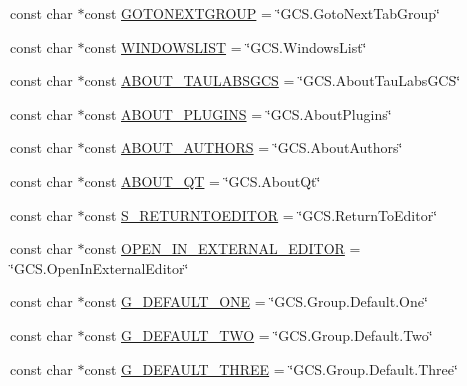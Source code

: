 \begin{DoxyCompactItemize}
\item 
const char $\ast$const \hyperlink{group___core_plugin_gae62f4649a82a845514a98ad61e2fb37a}{\-G\-O\-T\-O\-N\-E\-X\-T\-G\-R\-O\-U\-P} = \char`\"{}\-G\-C\-S.\-Goto\-Next\-Tab\-Group\char`\"{}
\item 
const char $\ast$const \hyperlink{group___core_plugin_ga131a36808daf98493ba6caac1df75d3f}{\-W\-I\-N\-D\-O\-W\-S\-L\-I\-S\-T} = \char`\"{}\-G\-C\-S.\-Windows\-List\char`\"{}
\item 
const char $\ast$const \hyperlink{group___core_plugin_ga3e397585903bccc171404c5e9e28db57}{\-A\-B\-O\-U\-T\-\_\-\-T\-A\-U\-L\-A\-B\-S\-G\-C\-S} = \char`\"{}\-G\-C\-S.\-About\-Tau\-Labs\-G\-C\-S\char`\"{}
\item 
const char $\ast$const \hyperlink{group___core_plugin_ga095daad5ebb7bc7b081dcf9189effc4a}{\-A\-B\-O\-U\-T\-\_\-\-P\-L\-U\-G\-I\-N\-S} = \char`\"{}\-G\-C\-S.\-About\-Plugins\char`\"{}
\item 
const char $\ast$const \hyperlink{group___core_plugin_gae913d5d04138374d54ecfdabbc3d01ad}{\-A\-B\-O\-U\-T\-\_\-\-A\-U\-T\-H\-O\-R\-S} = \char`\"{}\-G\-C\-S.\-About\-Authors\char`\"{}
\item 
const char $\ast$const \hyperlink{group___core_plugin_gaa6fbd8445ba06f267495ee4f86525521}{\-A\-B\-O\-U\-T\-\_\-\-Q\-T} = \char`\"{}\-G\-C\-S.\-About\-Qt\char`\"{}
\item 
const char $\ast$const \hyperlink{group___core_plugin_gab51aa14ec9c9023785bafb4efa396553}{\-S\-\_\-\-R\-E\-T\-U\-R\-N\-T\-O\-E\-D\-I\-T\-O\-R} = \char`\"{}\-G\-C\-S.\-Return\-To\-Editor\char`\"{}
\item 
const char $\ast$const \hyperlink{group___core_plugin_gaf07120113ef10979e6ee49d688fb42ce}{\-O\-P\-E\-N\-\_\-\-I\-N\-\_\-\-E\-X\-T\-E\-R\-N\-A\-L\-\_\-\-E\-D\-I\-T\-O\-R} = \char`\"{}\-G\-C\-S.\-Open\-In\-External\-Editor\char`\"{}
\item 
const char $\ast$const \hyperlink{group___core_plugin_ga522e575966eb8fe2374da35aac3e7d69}{\-G\-\_\-\-D\-E\-F\-A\-U\-L\-T\-\_\-\-O\-N\-E} = \char`\"{}\-G\-C\-S.\-Group.\-Default.\-One\char`\"{}
\item 
const char $\ast$const \hyperlink{group___core_plugin_ga4f77e1e87898edaae0fa296fdab5806d}{\-G\-\_\-\-D\-E\-F\-A\-U\-L\-T\-\_\-\-T\-W\-O} = \char`\"{}\-G\-C\-S.\-Group.\-Default.\-Two\char`\"{}
\item 
const char $\ast$const \hyperlink{group___core_plugin_gaa9d110a5d72f47a9f4893a54bebdef9d}{\-G\-\_\-\-D\-E\-F\-A\-U\-L\-T\-\_\-\-T\-H\-R\-E\-E} = \char`\"{}\-G\-C\-S.\-Group.\-Default.\-Three\char`\"{}

\end{DoxyCompactItemize}
